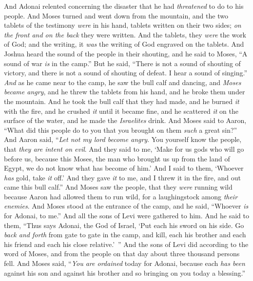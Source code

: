 \begin{biblechapter}
\verse And Adonai relented concerning the disaster that he had \textit{threatened} to do to his people.
\verse And Moses turned and went down from the mountain, and the two tablets of the testimony \textit{were} in his hand, tablets written on their two sides; \textit{on the front and on the back} they were written.
\verse And the tablets, they \textit{were} the work of God; and the writing, it \textit{was} the writing of God engraved on the tablets.
\verse And Joshua heard the sound of the people in their shouting, and he said to Moses, “A sound of war \textit{is} in the camp.”
\verse But he said, “There is not a sound of shouting of victory, and there is not a sound of shouting of defeat. I hear a sound of singing.”
\verse \textit{And} as he came near to the camp, he saw the bull calf and dancing, and \textit{Moses became angry}, and he threw the tablets from his hand, and he broke them under the mountain.
\verse And he took the bull calf that they had made, and he burned \textit{it} with the fire, and he crushed \textit{it} until it became fine, and he scattered \textit{it} on the surface of the water, and he made the \textit{Israelites} drink.
\verse And Moses said to Aaron, “What did this people do to you that you brought on them \textit{such} a great sin?”
\verse And Aaron said, “\textit{Let not my lord become angry}. You yourself know the people, that \textit{they are intent on evil}.
\verse And they said to me, ‘Make for us gods who will go before us, because this Moses, the man who brought us up from the land of Egypt, we do not know what has become of him.’
\verse And I said to them, ‘Whoever \textit{has} gold, take \textit{it} off.’ And they gave \textit{it} to me, and I threw it in the fire, and out came this bull calf.”
\verse And Moses saw the people, that they \textit{were} running wild because Aaron had allowed them to run wild, for a laughingstock among \textit{their enemies}.
\verse And Moses stood at the entrance of the camp, and he said, “Whoever \textit{is} for Adonai, to me.” And all the sons of Levi were gathered to him.
\verse And he said to them, “Thus says Adonai, the God of Israel, ‘Put each his sword on his side. Go \textit{back and forth} from gate to gate in the camp, and kill, each his brother and each his friend and each his close relative.’ ”
\verse And the sons of Levi did according to the word of Moses, and from the people on that day about three thousand persons fell.
\verse And Moses said, “\textit{You are ordained} today for Adonai, because each \textit{has been} against his son and against his brother and so bringing on you today a blessing.”

\end{biblechapter}
